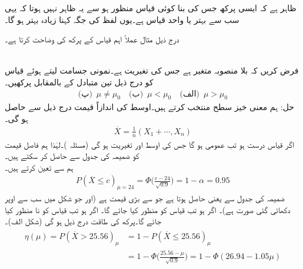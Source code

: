 ظاہر ہے کہ ایسی پرکھ جس کی بنا کوئی قیاس  منظور ہو سے یہ ظاہر نہیں ہوتا کہ یہی سب سے بہتر  یا واحد قیاس ہے۔یوں لفظ  کی جگہ  کہنا زیادہ بہتر ہو گا۔ 

درج ذیل مثال عملاً اہم قیاس کے پرکھ کی وضاحت کرتا ہے۔ 

\quad {}\\
فرض کریں کہ  بلا منصوبہ متغیر ہے جس کی تغیریت  ہے۔نمونی جسامت  لیتے ہوئے قیاس  کو درج ذیل تین متبادل کے بالمقابل پرکھیں۔
\begin{align*}
\text{(پ)}\,\,\, \mu \ne \mu_0 \quad \text{(ب)}\,\,\, \mu<\mu_0 \quad \text{(الف)}\,\,\,  \mu>\mu_0
\end{align*}
حل:\quad
ہم معنی خیز سطح  منتخب کرتے ہیں۔اوسط کی اندازاً قیمت درج ذیل سے حاصل ہو گی۔
\begin{align*}
\overline{X}=\frac{1}{n}(X_1+\cdots,X_n)
\end{align*}
اگر قیاس درست ہو تب  عمومی ہو گا جس کی اوسط  اور تغیریت  ہو گی (مسئلہ )۔لہٰذا ہم فاصل قیمت  کو ضمیمہ  کی جدول  سے حاصل کر سکتے ہیں۔\\
\quad
ہم  سے  تعین کرتے ہیں۔
\begin{align*}
P(\overline{X}\le c)_{\mu=24}=\Phi\big(\frac{c-24}{\sqrt{0.9}}\big)=1-\alpha=0.95
\end{align*}
ضمیمہ  کی جدول   سے  یعنی  حاصل ہوتا ہے جو  سے بڑی قیمت ہے (اور جو شکل  میں سب سے اوپر دکھائی گئی صورت ہے)۔ اگر  ہو تب قیاس کو منظور کیا جائے گا۔ اگر  ہو تب قیاس کو نا منظور کیا جائے گا۔پرکھ کی طاقت درج ذیل ہو گی (شکل  الف)۔
\begin{gather}
\begin{aligned}
\eta(\mu)=P(\overline{X}>25.56)_{\mu}&=1-P(\overline{X}\le 25.56)_{\mu}\\
&=1-\Phi\big(\frac{25.56-\mu}{\sqrt{0.9}}\big)=1-\Phi(26.94-1.05\mu)
\end{aligned}
\end{gather}
